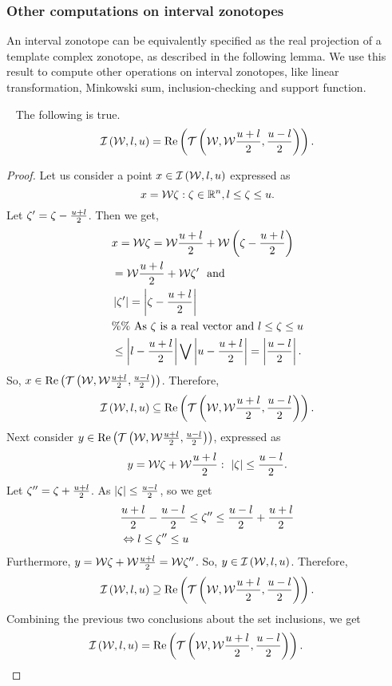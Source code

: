 


\subsubsection*{Other computations on interval zonotopes}
%
An interval zonotope can be equivalently specified as the real
projection of a template complex zonotope, as described in the
following lemma.  We use this result to compute other operations on
interval zonotopes, like linear transformation, Minkowski sum,
inclusion-checking and support function.
%
\begin{lemma}~\label{lem:iz-tcz-conversion}
The following is true.
%
\[
\mathit{\operatorname{\mathcal{I}}}\left(\mathcal{W},l,u\right)=\operatorname{Re}\left(\mathit{\operatorname{\mathcal{T}}}\left(\mathcal{W},\mathcal{W}\frac{u+l}{2},\frac{u-l}{2}\right)\right).
\]
%
\end{lemma}
%
\begin{proof}
Let us consider a point $x\in\mathit{\operatorname{\mathcal{I}}}\left(\mathcal{W},l,u\right)$ expressed as
%
\[
x=\mathcal{W}\zeta:\zeta\in\mathbb{R}^n,l\leq\zeta\leq u.
\]
%
  Let $\zeta^\prime=
\zeta-\frac{u+l}{2}$.
Then we get,
%
\begin{align*}
& x=\mathcal{W}\zeta=\mathcal{W}\frac{u+l}{2}+\mathcal{W}\left(\zeta-\frac{u+l}{2}\right)\\
& = \mathcal{W}\frac{u+l}{2}+\mathcal{W}\zeta^\prime~~\text{and}\\
& \left|\zeta^\prime\right|=\left|\zeta-\frac{u+l}{2}\right|\\
& \%\%~\text{As $\zeta$ is a real vector and $l\leq\zeta\leq u$}\\
& \leq \left|l-\frac{u+l}{2}\right|\bigvee \left|u-\frac{u+l}{2}\right|
= \left|\frac{u-l}{2}\right|.
\end{align*}
%
So,
$x\in\operatorname{Re}\left(\mathit{\operatorname{\mathcal{T}}}\left(\mathcal{W},\mathcal{W}\frac{u+l}{2},\frac{u-l}{2}\right)\right)$.  Therefore,
%
\[
\mathit{\operatorname{\mathcal{I}}}\left(\mathcal{W},l,u\right)\subseteq\operatorname{Re}\left(\mathit{\operatorname{\mathcal{T}}}\left(\mathcal{W},\mathcal{W}\frac{u+l}{2},\frac{u-l}{2}\right)\right).
\]
%
Next consider $y\in\operatorname{Re}\left(\mathit{\operatorname{\mathcal{T}}}\left(\mathcal{W},\mathcal{W}\frac{u+l}{2},\frac{u-l}{2}\right)\right)$,
expressed as
\[
y=\mathcal{W}\zeta+\mathcal{W}\frac{u+l}{2}:~\left|\zeta\right|\leq\frac{u-l}{2}.
\]
%
Let $\zeta^{\prime\prime}=\zeta+\frac{u+l}{2}$.
As
$\left|\zeta\right|\leq\frac{u-l}{2}$, so we get
%
\begin{align*}
&
\frac{u+l}{2}-\frac{u-l}{2}\leq\zeta^{\prime\prime}\leq\frac{u-l}{2}+\frac{u+l}{2}\\
& \Leftrightarrow l\leq\zeta^{\prime\prime}\leq u
\end{align*}
%
Furthermore, $y=\mathcal{W}\zeta+\mathcal{W}\frac{u+l}{2}=\mathcal{W}\zeta^{\prime\prime}$.
So, $y\in\mathit{\operatorname{\mathcal{I}}}\left(\mathcal{W},l,u\right)$.  Therefore,
%
\[
\mathit{\operatorname{\mathcal{I}}}\left(\mathcal{W},l,u\right)\supseteq\operatorname{Re}\left(\mathit{\operatorname{\mathcal{T}}}\left(\mathcal{W},\mathcal{W}\frac{u+l}{2},\frac{u-l}{2}\right)\right).
\]
%
Combining the previous two conclusions about the set inclusions, we get
%
\[
\mathit{\operatorname{\mathcal{I}}}\left(\mathcal{W},l,u\right)=\operatorname{Re}\left(\mathit{\operatorname{\mathcal{T}}}\left(\mathcal{W},\mathcal{W}\frac{u+l}{2},\frac{u-l}{2}\right)\right).~~~~~~\qedhere
\]
%
\end{proof}
